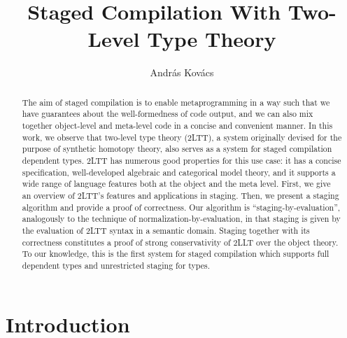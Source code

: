 \documentclass[acmsmall]{acmart}
\theoremstyle{remark}
\begin{document}
\title{Staged Compilation With Two-Level Type Theory}

\author{András Kovács}

\begin{abstract}
  The aim of staged compilation is to enable metaprogramming in a way such that
  we have guarantees about the well-formedness of code output, and we can also
  mix together object-level and meta-level code in a concise and convenient
  manner. In this work, we observe that two-level type theory (2LTT), a system
  originally devised for the purpose of synthetic homotopy theory, also serves
  as a system for staged compilation dependent types. 2LTT has numerous good
  properties for this use case: it has a concise specification, well-developed
  algebraic and categorical model theory, and it supports a wide range of
  language features both at the object and the meta level. First, we give an
  overview of 2LTT's features and applications in staging. Then, we present a
  staging algorithm and provide a proof of correctness. Our algorithm is
  ``staging-by-evaluation'', analogously to the technique of
  normalization-by-evaluation, in that staging is given by the evaluation of
  2LTT syntax in a semantic domain. Staging together with its correctness
  constitutes a proof of strong conservativity of 2LLT over the object
  theory. To our knowledge, this is the first system for staged compilation which
  supports full dependent types and unrestricted staging for types.
\end{abstract}

\begin{CCSXML}
\end{CCSXML}

\maketitle

\section{Introduction}
\end{document}
